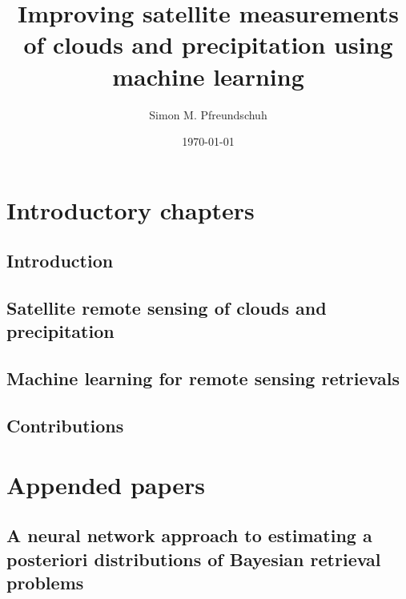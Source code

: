 \documentclass[12pt, a4paper, twoside]{report}
\title{Improving satellite measurements of clouds and precipitation using machine learning}
\author{Simon M. Pfreundschuh}
\date{\today}
\begin{document}





\tableofcontents
\clearpage


\part{Introductory chapters}

\chapter{Introduction}


\chapter{Satellite remote sensing of clouds and precipitation}


\chapter{Machine learning for remote sensing retrievals}


\chapter{Contributions}



 

\part{Appended papers}

\renewcommand{\chaptername}{Paper}
\setcounter{chapter}{0}

\chapter{A neural network approach to estimating a posteriori distributions of Bayesian retrieval problems} 
\label{chap:qrnn}
\thispagestyle{empty}
\cleardoublepage            %

\end{document}
